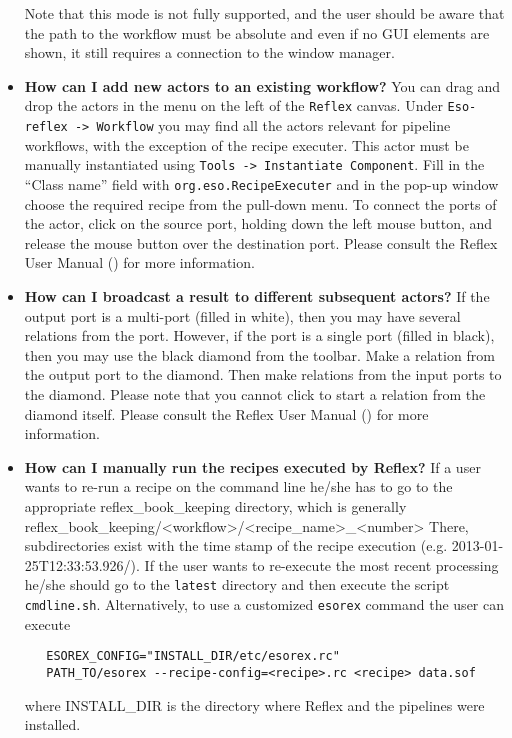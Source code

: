 \begin{itemize}
   Note that this mode is not fully supported, and the user should be 
   aware that the path to the workflow must be absolute and even if no
   GUI elements are shown, it still requires a connection to the window manager.
        
   \item {\bf How can I add new actors to an existing workflow?}
   You can drag and drop the actors in the menu on the left of the {\tt Reflex} 
   canvas. Under {\tt Eso-reflex -> Workflow} you may find all the actors
   relevant for pipeline workflows, with the exception of the recipe executer.
   This actor must be manually instantiated using
   {\tt Tools -> Instantiate Component}. Fill in the ``Class name'' field with 
   {\tt org.eso.RecipeExecuter} and in the pop-up window choose the required 
   recipe from the pull-down menu. To connect the ports of the actor, click on
   the source port, holding down the left mouse button, and release the mouse
   button over the destination port. Please consult the Reflex User Manual
   (\cite{REFLEXMAN}) for more information.

   \item {\bf How can I broadcast a result to different subsequent actors?}
   If the output port is a multi-port (filled in white), then you may have
   several relations from the port. However, if the port is a single port
   (filled in black), then you may use the black diamond from the toolbar.
   Make a relation from the output port to the diamond. Then make relations 
   from the input ports to the diamond. Please note that you cannot click to 
   start a relation from the diamond itself. Please consult the Reflex User 
   Manual (\cite{REFLEXMAN}) for more information.

   \item {\bf How can I manually run the recipes executed by Reflex?}
   If a user wants to re-run a recipe on the command line he/she has to go to
   the appropriate reflex\_book\_keeping directory, which is generally 
   reflex\_book\_keeping/<workflow>/<recipe\_name>\_<number> 
   There, subdirectories exist with 
   the time stamp of the recipe execution (e.g. 2013-01-25T12:33:53.926/). 
   If the user wants to re-execute the most recent processing he/she should 
   go to the {\tt latest} directory and then execute the script 
   {\tt cmdline.sh}. Alternatively, to use a customized {\tt esorex} command
   the user can execute
   \begin{verbatim}
   ESOREX_CONFIG="INSTALL_DIR/etc/esorex.rc"
   PATH_TO/esorex --recipe-config=<recipe>.rc <recipe> data.sof 
   \end{verbatim}
   where INSTALL\_DIR is the directory where Reflex and the pipelines were
   installed. 


\end{itemize}
